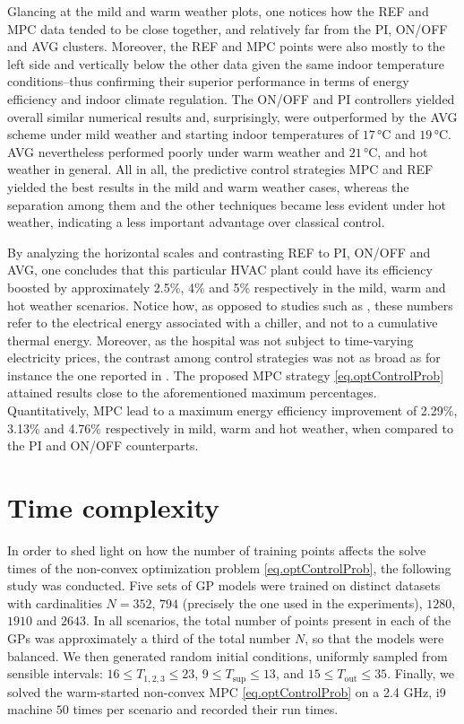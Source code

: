 Glancing at the mild and warm weather plots, one notices how the REF and MPC data tended to be close together, and relatively far from the PI, ON/OFF and AVG clusters. Moreover, the REF and MPC points were also mostly to the left side and vertically below the other data given the same indoor temperature conditions--thus confirming their superior performance in terms of energy efficiency and indoor climate regulation. The ON/OFF and PI controllers yielded overall similar numerical results and, surprisingly, were outperformed by the AVG scheme under mild weather and starting indoor temperatures of $17\,$°C and $19\,$°C. AVG nevertheless performed poorly under warm weather and $21\,$°C, and hot weather in general. All in all, the predictive control strategies MPC and REF yielded the best results in the mild and warm weather cases, whereas the separation among them and the other techniques became less evident under hot weather, indicating a less important advantage over classical control.

By analyzing the horizontal scales and contrasting REF to PI, ON/OFF and AVG, one concludes that this particular HVAC plant could have its efficiency boosted by approximately 2.5\%, 4\% and 5\% respectively in the mild, warm and hot weather scenarios. Notice how, as opposed to studies such as \cite{bunning2020experimental}, these numbers refer to the electrical energy associated with a chiller, and not to a cumulative thermal energy. Moreover, as the hospital was not subject to time-varying electricity prices, the contrast among control strategies was not as broad as for instance the one reported in \cite{joe2022investigation}. The proposed MPC strategy \eqref{eq.optControlProb} attained results close to the aforementioned maximum percentages. Quantitatively, MPC lead to a maximum energy efficiency improvement of 2.29\%, 3.13\% and 4.76\% respectively in mild, warm and hot weather, when compared to the PI and ON/OFF counterparts.

\section{Time complexity}


In order to shed light on how the number of training points affects the solve times of the non-convex optimization problem \eqref{eq.optControlProb}, the following study was conducted. Five sets of GP models were trained on distinct datasets with cardinalities $N = 352$, $794$ (precisely the one used in the experiments), $1280$, $1910$ and $2643$. In all scenarios, the total number of points present in each of the GPs was approximately a third of the total number $N$, so that the models were balanced. We then generated random initial conditions, uniformly sampled from sensible intervals: $16 \leq T_{1,2,3} \leq 23$, $9 \leq T_\text{sup} \leq 13$, and $15 \leq T_\text{out} \leq 35$. Finally, we solved the warm-started non-convex MPC \eqref{eq.optControlProb} on a 2.4 GHz, i9 machine $50$ times per scenario and recorded their run times. 


